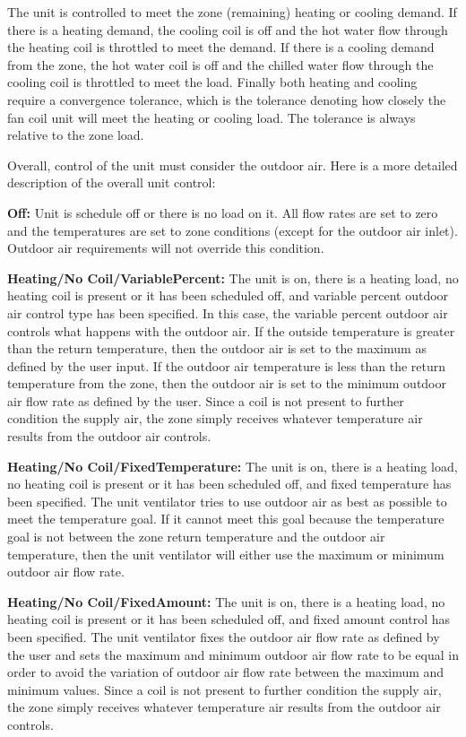 The unit is controlled to meet the zone (remaining) heating or cooling demand. If there is a heating demand, the cooling coil is off and the hot water flow through the heating coil is throttled to meet the demand. If there is a cooling demand from the zone, the hot water coil is off and the chilled water flow through the cooling coil is throttled to meet the load. Finally both heating and cooling require a convergence tolerance, which is the tolerance denoting how closely the fan coil unit will meet the heating or cooling load. The tolerance is always relative to the zone load.

Overall, control of the unit must consider the outdoor air. Here is a more detailed description of the overall unit control:

\textbf{Off:} Unit is schedule off or there is no load on it. All flow rates are set to zero and the temperatures are set to zone conditions (except for the outdoor air inlet). Outdoor air requirements will not override this condition.

\textbf{Heating/No Coil/VariablePercent:} The unit is on, there is a heating load, no heating coil is present or it has been scheduled off, and variable percent outdoor air control type has been specified. In this case, the variable percent outdoor air controls what happens with the outdoor air. If the outside temperature is greater than the return temperature, then the outdoor air is set to the maximum as defined by the user input. If the outdoor air temperature is less than the return temperature from the zone, then the outdoor air is set to the minimum outdoor air flow rate as defined by the user. Since a coil is not present to further condition the supply air, the zone simply receives whatever temperature air results from the outdoor air controls.

\textbf{Heating/No Coil/FixedTemperature:} The unit is on, there is a heating load, no heating coil is present or it has been scheduled off, and fixed temperature has been specified. The unit ventilator tries to use outdoor air as best as possible to meet the temperature goal. If it cannot meet this goal because the temperature goal is not between the zone return temperature and the outdoor air temperature, then the unit ventilator will either use the maximum or minimum outdoor air flow rate.

\textbf{Heating/No Coil/FixedAmount:} The unit is on, there is a heating load, no heating coil is present or it has been scheduled off, and fixed amount control has been specified. The unit ventilator fixes the outdoor air flow rate as defined by the user and sets the maximum and minimum outdoor air flow rate to be equal in order to avoid the variation of outdoor air flow rate between the maximum and minimum values. Since a coil is not present to further condition the supply air, the zone simply receives whatever temperature air results from the outdoor air controls.

